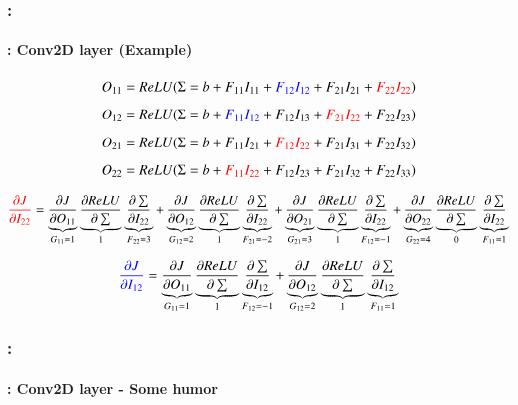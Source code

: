 \documentclass[xcolor=table]{beamer}
\begin{document}
\begin{frame}
	\frametitle{\insertshortsubtitle: \insertsection}
	\framesubtitle{\insertsubsection: Conv2D layer (Example)}
	
	
	\begin{center}
		\vskip-6pt
	\end{center}\vskip-16pt
	
	{\scriptsize 
		\[O_{11} = ReLU(\Sigma = b + F_{11} I_{11} + \textcolor{blue}{F_{12} I_{12}} + F_{21} I_{21} + \textcolor{red}{F_{22} I_{22}})  \]
		\[O_{12} = ReLU(\Sigma = b + \textcolor{blue}{F_{11} I_{12}} + F_{12} I_{13} + \textcolor{red}{F_{21} I_{22}} + F_{22} I_{23})  \]
		\[O_{21} = ReLU(\Sigma = b + F_{11} I_{21} + \textcolor{red}{F_{12} I_{22}} + F_{21} I_{31} + F_{22} I_{32})  \]
		\[O_{22} = ReLU(\Sigma = b + \textcolor{red}{F_{11} I_{22}} + F_{12} I_{23} + F_{21} I_{32} + F_{22} I_{33})  \]
		
		\[\textcolor{red}{\frac{\partial J}{\partial I_{22}}} 
		= \underbrace{\frac{\partial J}{\partial O_{11}}}_{G_{11} = 1} 
		\underbrace{\frac{\partial ReLU}{\partial \sum}}_{1} 
		\underbrace{\frac{\partial \sum}{\partial I_{22}}}_{F_{22} = 3}
		+ \underbrace{\frac{\partial J}{\partial O_{12}}}_{G_{12} = 2} 
		\underbrace{\frac{\partial ReLU}{\partial \sum}}_{1} 
		\underbrace{\frac{\partial \sum}{\partial I_{22}}}_{F_{21} = -2}
		+ \underbrace{\frac{\partial J}{\partial O_{21}}}_{G_{21} = 3} 
		\underbrace{\frac{\partial ReLU}{\partial \sum}}_{1} 
		\underbrace{\frac{\partial \sum}{\partial I_{22}}}_{F_{12} = -1}
		+ \underbrace{\frac{\partial J}{\partial O_{22}}}_{G_{22} = 4} 
		\underbrace{\frac{\partial ReLU}{\partial \sum}}_{0} 
		\underbrace{\frac{\partial \sum}{\partial I_{22}}}_{F_{11} = 1}\]
		
		\[\textcolor{blue}{\frac{\partial J}{\partial I_{12}}} 
		= \underbrace{\frac{\partial J}{\partial O_{11}}}_{G_{11} = 1} 
		\underbrace{\frac{\partial ReLU}{\partial \sum}}_{1} 
		\underbrace{\frac{\partial \sum}{\partial I_{12}}}_{F_{12} = -1}
		+ \underbrace{\frac{\partial J}{\partial O_{12}}}_{G_{12} = 2} 
		\underbrace{\frac{\partial ReLU}{\partial \sum}}_{1} 
		\underbrace{\frac{\partial \sum}{\partial I_{12}}}_{F_{11} = 1}\]
	}
	
\end{frame}

\begin{frame}
	\frametitle{\insertshortsubtitle: \insertsection}
	\framesubtitle{\insertsubsection: Conv2D layer - Some humor}
	
	\begin{center}
	\end{center}
	
\end{frame}
\end{document}
